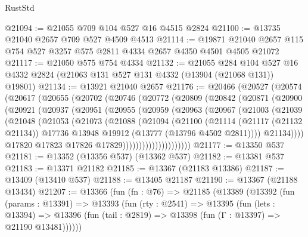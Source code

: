 \begin{lexlean}{RustStd}
\begin{coremodule}
@21094 := @21055 @709 @104 @527 @16 @4515 @2824
@21100 := @13735 @21040 @2657 @709 @527 @4509 @4513
@21114 := @19871 @21040 @2657 @115 @754 @527 @3257 @575 @2811 @4334 @2657 @4350 @4501 @4505 @21072
@21117 := @21050 @575 @754 @4334
@21132 := @21055
    @284
    @104
    @527
    @16
    @4332
    @2824
    (@21063 @131 @527 @131 @4332 (@13904 (@21068 @131)) @19801)
@21134 := @13921 @21040 @2657
@21176 := @20466
    (@20527
      (@20574
        (@20617
          (@20655
            (@20702
              (@20746
                (@20772
                  (@20809
                    (@20842
                      (@20871
                        (@20900
                          (@20921
                            (@20937
                              (@20951
                                (@20955
                                  (@20959
                                    (@20963
                                      (@20967
                                        (@21003
                                          (@21039
                                            (@21048
                                              (@21053
                                                (@21073
                                                  (@21088
                                                    (@21094
                                                      (@21100
                                                        (@21114
                                                          (@21117 (@21132 @21134))
                                                          @17736
                                                          @13948
                                                          @19912
                                                          (@13777 (@13796 @4502 @2811))))
                                                      @21134))))
                                              @17820
                                              @17823
                                              @17826
                                              @17829)))))))))))))))))))))
@21177 := @13350 @537
@21181 := @13352 (@13356 @537) (@13362 @537)
@21182 := @13381 @537
@21183 := @13371 @21182
@21185 := @13367 (@21183 @13386)
@21187 := @13409 (@13410 @537)
@21188 := @13405 @21187
@21190 := @13367 (@21188 @13434)
@21207 := @13366
    (fun (fn : @76) =>
    @21185
      (@13389
        (@13392
          (fun (params : @13391) =>
          @13393
            (fun (rty : @2541) =>
            @13395
              (fun (lets : @13394) =>
              @13396 (fun (tail : @2819) => @13398 (fun (Γ : @13397) => @21190 @13481))))))

\end{coremodule}
\end{lexlean}
